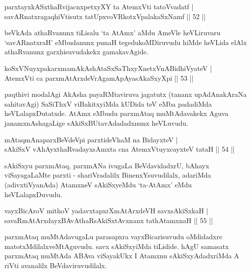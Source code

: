 \begin{shl}
parxtayxkASxthaRvijacnxpetxyXY ta AtemxVti tatoV\s vadatf |\\
savARnatxragaqhiVtisutx tatUpxvoVRkotxVpalakaSxNamf \hfill || 52 ||
\end{shl}


\begin{artha}
 beVkAda athaRvanunx tiLisalu `ta AtAmx' aMdu AmeVle heVLiruvaru `savARnatxraH' eMbudanunx punaH tegedukoMDiruvudu hiMde heVLida elAlx athaRvanunx garxhisuvudakekx gamakavAgide.
\end{artha}


\begin{shl}
koSxVNuyxpakarxmamAkAshAtaSxSaThxyXnetxVnABidhiVyateV |\\
AtemxVti ca parxmAtArxdeVrAgamApAyasAkaSxyXpi \hfill || 53 ||
\end{shl}

\begin{artha}
paqthivi modalAgi AkAsha payaRMtaviruva jagatutx (tananx upAdAnakAraNa sahitavAgi) SaSiThxV viBakitxyiMda kUDida teV eMba padadiMda heVLalapxDutatxde. AtAmx eMbudu parxmAtaq muMtAdavakekx Aguva janamxnAshagaLige sAkiSxBUtavAdadadxnunx heVLuvudu. 
\end{artha}


\begin{shl}
mAtaqmAnaparxBeVdeV\s pi parxtideVhaM na BidayxteV |\\
sAkiSxV vAhAyxthaRvadayxsAmxta cna AtemxVtuyxcayxteV tataH \hfill || 54 ||
\end{shl}

\begin{artha}
sAkiSxyu parxmAtaq, parxmANa ivugaLa BeVdavidadxrU, bAhayx viSayagaLaMte parxti - shariVradalilx BinenxYsuvudilalx, adariMda (adivxtiVyanAda) AtamxneV sAkiSxyeMdu `ta-AtAmx' eMdu heVLalapxDuvudu.
\end{artha}

\begin{shl}
vayxBicAroV mithoV yadavxtapxrXmAtArxdeVH savxsAkiSxkaH |\\
savaRmAtArxdayxBAvAthaRsAkiSxtAvxnanx tathA\s \s tamxnaH \hfill || 55 ||
\end{shl}

\begin{artha}
parxmAtaq muMtAdavugaLu parasapxra vayxBicarisuvudu oMdidadxre matotxMdilalxveMtAguvudu. savx sAkiSxyiMda tiLidide. hAgU samasatx parxmAtaq muMtAda ABAva viSayakUkx I Atamxnu sAkiSxyAdadxriMda A riVti avanalilx BeVdaviruvudilalx.
\end{artha}

